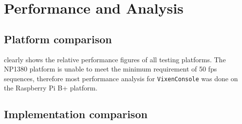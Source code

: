 \chapter{Performance and Analysis}
\renewcommand{\baselinestretch}{\mystretch}
\label{chap:Perf}

\section{Platform comparison}

 clearly shows the relative performance figures of all testing platforms. The NP1380 platform is unable to meet the minimum requirement of 50 fps sequences, therefore most performance analysis for \texttt{VixenConsole} was done on the Raspberry Pi B+ platform.

\section{Implementation comparison}

